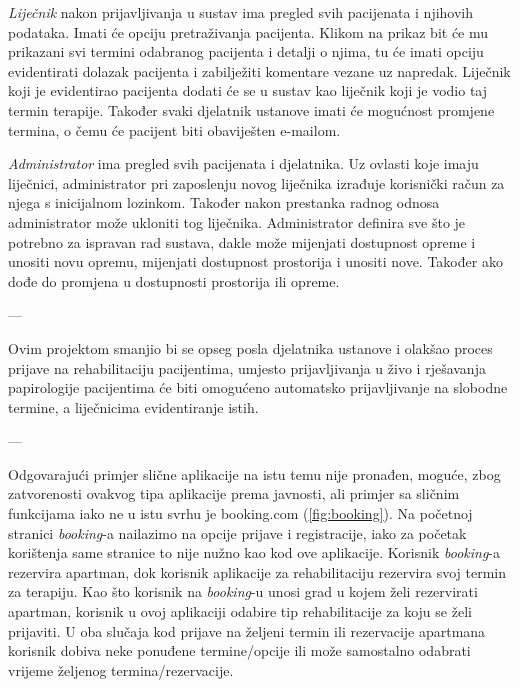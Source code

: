		\textit{Liječnik} nakon prijavljivanja u sustav ima pregled svih pacijenata i njihovih podataka. Imati će opciju pretraživanja pacijenta. Klikom na prikaz bit će mu prikazani svi termini odabranog pacijenta i detalji o njima, tu će imati opciju evidentirati dolazak pacijenta i zabilježiti komentare vezane uz napredak. Liječnik koji je evidentirao pacijenta dodati će se u sustav kao liječnik koji je vodio taj termin terapije. Također svaki djelatnik ustanove imati će mogućnost promjene termina, o čemu će pacijent biti obaviješten e-mailom. 
		
		\textit{Administrator} ima pregled svih pacijenata i djelatnika. Uz ovlasti koje imaju liječnici, administrator pri zaposlenju novog liječnika izrađuje korisnički račun za njega s inicijalnom lozinkom. Također nakon prestanka radnog odnosa administrator može ukloniti tog liječnika. Administrator definira sve što je potrebno za ispravan rad sustava, dakle može mijenjati dostupnost opreme i unositi novu opremu, mijenjati dostupnost prostorija i unositi nove. Također ako dođe do promjena u dostupnosti prostorija ili opreme.
		
		---
		
		Ovim projektom smanjio bi se opseg posla djelatnika ustanove i olakšao proces prijave na rehabilitaciju pacijentima, umjesto prijavljivanja u živo i rješavanja papirologije pacijentima će biti omogućeno automatsko prijavljivanje na slobodne termine, a liječnicima evidentiranje istih. 
		
		---
		
		Odgovarajući primjer slične aplikacije na istu temu nije pronađen, moguće, zbog zatvorenosti ovakvog tipa aplikacije prema javnosti, ali primjer sa sličnim funkcijama iako ne u istu svrhu je booking.com (\ref{fig:booking}). Na početnoj stranici \textit{booking}-a nailazimo na opcije prijave i registracije, iako za početak korištenja same stranice to nije nužno kao kod ove aplikacije. Korisnik \textit{booking}-a rezervira apartman, dok korisnik aplikacije za rehabilitaciju rezervira svoj termin za terapiju. Kao što korisnik na \textit{booking}-u unosi grad u kojem želi rezervirati apartman, korisnik u ovoj aplikaciji odabire tip rehabilitacije za koju se želi prijaviti. U oba slučaja kod prijave na željeni termin ili rezervacije apartmana korisnik dobiva neke ponuđene termine/opcije ili može samostalno odabrati vrijeme željenog termina/rezervacije. 
		
